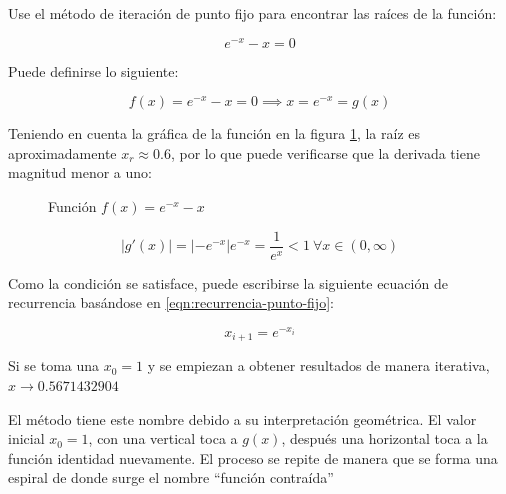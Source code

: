 \begin{ex}
    Use el método de iteración de punto fijo para encontrar las raíces de la
    función:

    \[
        e^{-x} - x = 0
    \]

    \begin{solution}
        Puede definirse lo siguiente:

        \[
            f(x) = e^{-x} - x = 0 \implies x = e^{-x} = g(x)
        \]

        Teniendo en cuenta la gráfica de la función en la figura
        \ref{fig:ejercicio-punto-fijo}, la raíz es aproximadamente $x_r \approx
        0.6$, por lo que puede verificarse que la derivada tiene magnitud menor
        a uno:

        \begin{figure}
            \centering
            \caption{Función $f(x) = e^{-x} - x$}
            \label{fig:ejercicio-punto-fijo}
        \end{figure}

        \[
            \left| g'(x) \right| = \left| -e^{-x} \right| e^{-x} =
            \frac{1}{e^x} < 1\ \forall x \in (0, \infty)
        \]

        Como la condición se satisface, puede escribirse la siguiente ecuación
        de recurrencia basándose en \ref{eqn:recurrencia-punto-fijo}:

        \[
            x_{i+1} = e^{-x_i}
        \]

        Si se toma una $x_0 = 1$ y se empiezan a obtener resultados de
        manera iterativa, $x \rightarrow 0.5671432904$

    \end{solution}
\end{ex}

El método tiene este nombre debido a su interpretación geométrica. El valor
inicial $x_0 = 1$, con una vertical toca a $g(x)$, después una horizontal toca a
la función identidad nuevamente. El proceso se repite de manera que se forma una
espiral de donde surge el nombre ``función contraída''

